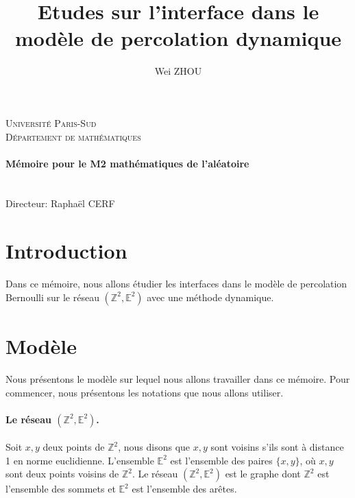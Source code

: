 \documentclass[titlepage,a4paper,12pt]{article}
\title{Etudes sur l'interface dans le modèle de percolation dynamique}
\author{Wei ZHOU}
\begin{document}
\makeatletter
  \begin{titlepage}
  \centering
      {\large \textsc{Université Paris-Sud}}\\
      \textsc{Département de mathématiques}\\
      {\large\textbf{	\@date\\
       Mémoire pour le M2 mathématiques de l'aléatoire}}\\
    \vfill
       {\LARGE \textbf{\@title}} \\
    \vspace{2em}
        {\large \@author} \\
    \vspace{2em}
    		{\large Directeur: Raphaël CERF}
    \vfill
  \end{titlepage}
\makeatother

\tableofcontents

\newpage
\section{Introduction}
Dans ce mémoire, nous allons étudier les interfaces dans le modèle de percolation Bernoulli sur le réseau $(\mathbb{Z}^2,\mathbb{E}^2)$ avec une méthode dynamique.

\section{Modèle}
Nous présentons le modèle sur lequel nous allons travailler dans ce mémoire. Pour commencer, nous présentons les notations que nous allons utiliser.

\paragraph{Le réseau $(\mathbb{Z}^2,\mathbb{E}^2)$.} Soit $x,y$ deux points de $\mathbb{Z}^2$, nous disons que $x,y$ sont voisins s'ils sont à distance 1 en norme euclidienne. L'ensemble $\mathbb{E}^2$ est l'ensemble des paires $\{x,y\}$, où $x,y$ sont deux points voisins de $\mathbb{Z}^2$. Le réseau $(\mathbb{Z}^2, \mathbb{E}^2)$ est le graphe dont $\mathbb{Z}^2$ est l'ensemble des sommets et $\mathbb{E}^2$ est l'ensemble des arêtes.
\end{document}
